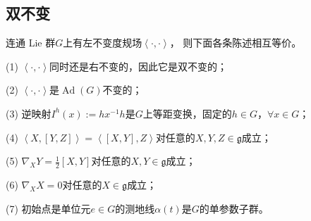 \subsection{双不变}

\begin{theorem}\label{chlg:thm_biinmg}
    连通 Lie 群$G$上有左不变度规场$\left<\cdot,\cdot\right>$，
    则下面各条陈述相互等价。

    (1) $\left<\cdot,\cdot\right>$同时还是右不变的，因此它是双不变的；

    (2) $\left<\cdot,\cdot\right>$是$\operatorname{Ad}(G)$不变的；

    (3) 逆映射$I^h(x) := h  x^{-1} h $是$G$上等距变换，固定的$h\in G$，$\forall x\in G$；

    (4) $\left<X,[Y,Z]\right>=\left<[X,Y],Z\right>$对任意的$X,Y,Z\in \mathfrak{g}$成立；

    (5) $\nabla_X Y = \frac{1}{2} [X,Y]$对任意的$X,Y\in \mathfrak{g}$成立；

    (6) $\nabla_X X = 0$对任意的$X\in \mathfrak{g}$成立；

    (7) 初始点是单位元$e\in G$的测地线$\alpha(t)$是$G$的单参数子群。
\end{theorem}

